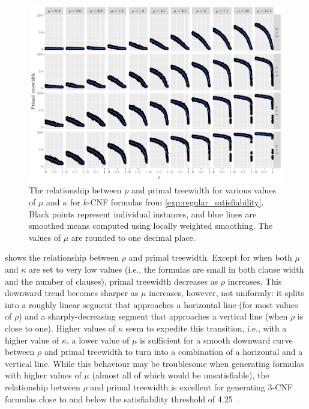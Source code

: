 \documentclass{article}
\theoremstyle{definition}
\begin{document}
\begin{figure}[t]
  \centering
  \includegraphics{regular_repetitiveness.pdf}
  \caption{The relationship between $\rho$ and primal treewidth for various
    values of $\mu$ and $\kappa$ for $k$-CNF formulas from
    \cref{exp:regular_satisfiability}. Black points represent individual
    instances, and blue lines are smoothed means computed using locally weighted
    smoothing. The values of $\mu$ are rounded to one decimal
    place.}\label{fig:regular_repetitiveness}
\end{figure}

 shows the relationship between $\rho$ and
primal treewidth. Except for when both $\mu$ and $\kappa$ are set to very low
values (i.e., the formulas are small in both clause width and the number of
clauses), primal treewidth decreases as $\rho$ increases. This downward trend
becomes sharper as $\mu$ increases, however, not uniformly: it splits into a
roughly linear segment that approaches a horizontal line (for most values of
$\rho$) and a sharply-decreasing segment that approaches a vertical line (when
$\rho$ is close to one). Higher values of $\kappa$ seem to expedite this
transition, i.e., with a higher value of $\kappa$, a lower value of $\mu$ is
sufficient for a smooth downward curve between $\rho$ and primal treewidth to
turn into a combination of a horizontal and a vertical line. While this
behaviour may be troublesome when generating formulas with higher values of
$\mu$ (almost all of which would be unsatisfiable), the relationship between
$\rho$ and primal treewidth is excellent for generating 3-CNF formulas close to
and below the satisfiability threshold of
4.25~\cite{DBLP:journals/ai/CrawfordA96}.
\end{document}

